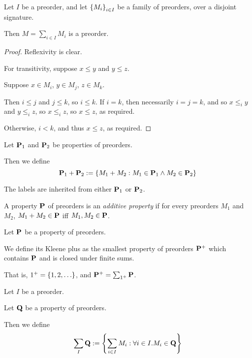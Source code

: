 \begin{lemma}
  Let $I$ be a preorder, and let $\left\{ {M_i} \right\}_{i \in I}$ be a family of preorders,
  over a disjoint signature.

  Then $M = \sum_{i \in I} M_i$ is a preorder.
\end{lemma}

\begin{proof}
  Reflexivity is clear.

  For transitivity, suppose $x \le y$ and $y \le z$.

  Suppose $x \in M_i$, $y \in M_j$, $z \in M_k$.

  Then $i \le j$ and $j \le k$, so $i \le k$.
  If $i = k$, then necessarily $i = j = k$, and so $x \le_i y$ and $y \le_i z$,
  so $x \le_i z$, so $x \le z$, as required.

  Otherwise, $i < k$, and thus $x \le z$, as required.
\end{proof}

\begin{definition}
  Let $\mathbf{P}_1$ and $\mathbf{P}_2$ be properties of preorders.

  Then we define
  \[
    \mathbf{P}_1 + \mathbf{P}_2 := \left\{ {M_1 + M_2 : M_1 \in \mathbf{P}_1 \wedge M_2 \in \mathbf{P}_2} \right\}
  \]

  The labels are inherited from either $\mathbf{P}_1$ or $\mathbf{P}_2$.
\end{definition}

\begin{definition}
  A property $\mathbf{P}$ of preorders is an \emph{additive property} if for every preorders $M_1$ and $M_2$,
  $M_1 + M_2 \in \mathbf{P}$ iff $M_1, M_2 \in \mathbf{P}$.
\end{definition}

\begin{definition}
  Let $\mathbf{P}$ be a property of preorders.

  We define its Kleene plus as the smallest property of preorders $\mathbf{P}^+$ which contains $\mathbf{P}$ and is closed under
  finite sums.

  That is, $1^+ = \left\{ {1, 2, \ldots} \right\}$, and $\mathbf{P}^+ = \sum_{1^+}{\mathbf{P}}$.
\end{definition}


\begin{definition}
  Let $I$ be a preorder.

  Let $\mathbf{Q}$ be a property of preorders.

  Then we define
  \[
    \sum_{I}{\mathbf{Q}} := \left\{ {\sum_{i \in I}{M_i} : \forall i \in I. M_i \in \mathbf{Q}} \right\}
  \]
\end{definition}


